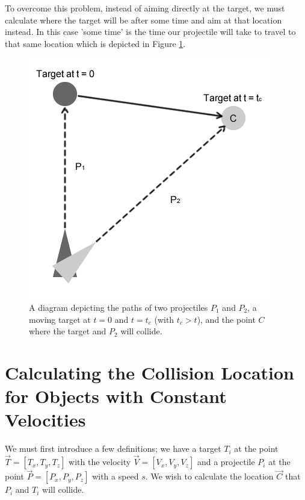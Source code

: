 \documentclass[12pt,a4paper]{report}
\begin{document}
To overcome this problem, instead of aiming directly at the target, we must calculate where the target will be after some time and aim at that location instead. In this case 'some time' is the time our projectile will take to travel to that same location which is depicted in Figure \ref{Moving_target_diagram_flat.png}.

\begin{figure}
	\centerline{\includegraphics[scale=0.8]{Moving_target_diagram_flat.png}}
	\caption{A diagram depicting the paths of two projectiles $P_{1}$ and $P_{2}$, a moving target at $t=0$ and $t=t_{c}$ (with $t_{c} > t$), and the point $C$ where the target and $P_{2}$ will collide.}
	\label{Moving_target_diagram_flat.png}
\end{figure}


\chapter{Calculating the Collision Location for Objects with Constant Velocities}
\label{Calculating Collision Locations for Constant Velocities}

We must first introduce a few definitions; we have a target $T_{i}$ at the point $\vec{T} = \left[T_{x}, T_{y}, T_{z}\right]$ with the velocity $\vec{V} = \left[V_{x},V_{y},V_{z}\right]$ and a projectile $P_{i}$ at the point $\vec{P} = \left[P_{x}, P_{y}, P_{z}\right]$ with a speed $s$. We wish to calculate the location $\vec{C}$ that $P_{i}$ and $T_{i}$ will collide.
\end{document}
